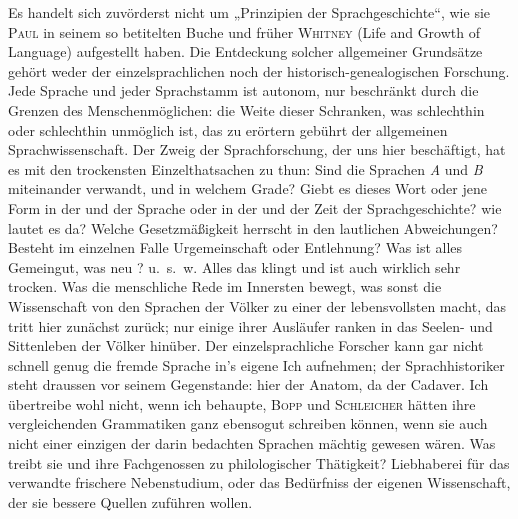 Es handelt sich  zuvörderst nicht um „Prinzipien der Sprachgeschichte“, wie sie \textsc{Paul} in seinem so betitelten Buche und früher \textsc{Whitney} (Life and Growth of Language) aufgestellt haben. Die Entdeckung solcher allgemeiner Grundsätze gehört weder der einzelsprachlichen noch der historisch-genealogischen Forschung. Jede Sprache und jeder Sprachstamm ist autonom, nur beschränkt durch die Grenzen des Menschenmöglichen: die Weite dieser Schranken, was schlechthin  oder schlechthin unmöglich ist, das zu erörtern gebührt der allgemeinen Sprachwissenschaft.  Der Zweig der Sprachforschung, der uns hier beschäftigt, hat es  mit den trockensten Einzelthatsachen zu thun: Sind die Sprachen \textit{A} und \textit{B} miteinander verwandt, und in welchem Grade? Giebt es dieses Wort oder jene Form in der und der Sprache oder in der und der Zeit der Sprachgeschichte? wie lautet es da? Welche Gesetzmäßigkeit herrscht in den lautlichen Abweichungen? Besteht im einzelnen Falle Urgemeinschaft oder Entlehnung? Was ist alles Gemeingut, was neu ? u.~s.~w. Alles das klingt und ist auch wirklich sehr trocken. Was die menschliche Rede im Innersten bewegt, was sonst die Wissenschaft von den Sprachen der Völker zu einer der lebensvollsten macht, das tritt hier zunächst zurück; nur einige ihrer Ausläufer ranken in das Seelen- und Sittenleben der Völker hinüber. Der einzelsprachliche Forscher kann gar nicht schnell genug die fremde Sprache in’s eigene Ich aufnehmen; der Sprachhistoriker steht draussen vor seinem Gegenstande: hier der Anatom, da der Cadaver. Ich übertreibe wohl nicht, wenn ich behaupte, \textsc{Bopp} und \textsc{Schleicher} hätten ihre ver\label{sp.137}gleichenden Grammatiken ganz ebensogut schreiben können, wenn sie \label{fp.146} auch nicht einer einzigen der darin bedachten Sprachen mächtig gewesen wären. Was treibt sie und ihre Fachgenossen zu philologischer Thätigkeit?  Liebhaberei für das verwandte frischere Nebenstudium, oder das Bedürfniss der eigenen Wissenschaft, der sie bessere Quellen zuführen wollen.

